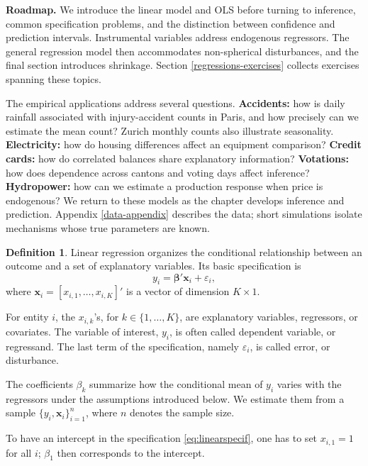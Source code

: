 \documentclass[
  11pt,
]{book}
\theoremstyle{definition}
\newtheorem{definition}{Definition}[chapter]
\theoremstyle{definition}
\theoremstyle{definition}
\theoremstyle{definition}
\theoremstyle{remark}
\begin{document}
\textbf{Roadmap.} We introduce the linear model and OLS before turning to inference, common specification problems, and the distinction between confidence and prediction intervals. Instrumental variables address endogenous regressors. The general regression model then accommodates non-spherical disturbances, and the final section introduces shrinkage. Section \ref{regressions-exercises} collects exercises spanning these topics.

The empirical applications address several questions. \textbf{Accidents:} how is daily rainfall associated with injury-accident counts in Paris, and how precisely can we estimate the mean count? Zurich monthly counts also illustrate seasonality. \textbf{Electricity:} how do housing differences affect an equipment comparison? \textbf{Credit cards:} how do correlated balances share explanatory information? \textbf{Votations:} how does dependence across cantons and voting days affect inference? \textbf{Hydropower:} how can we estimate a production response when price is endogenous? We return to these models as the chapter develops inference and prediction. Appendix \ref{data-appendix} describes the data; short simulations isolate mechanisms whose true parameters are known.

\begin{definition}
\protect\hypertarget{def:essai}{}\label{def:essai}Linear regression organizes the conditional relationship between an outcome and a set of explanatory variables. Its basic specification is
\begin{equation}
y_i = \boldsymbol\beta'\mathbf{x}_{i} + \varepsilon_i,\label{eq:linearspecif}
\end{equation}
where \(\mathbf{x}_{i}=[x_{i,1},\dots,x_{i,K}]'\) is a vector of dimension \(K \times 1\).
\end{definition}

For entity \(i\), the \(x_{i,k}\)'s, for \(k \in \{1,\dots,K\}\), are explanatory variables, regressors, or covariates. The variable of interest, \(y_i\), is often called dependent variable, or regressand. The last term of the specification, namely \(\varepsilon_i\), is called error, or disturbance.

The coefficients \(\beta_k\) summarize how the conditional mean of \(y_i\) varies with the regressors under the assumptions introduced below. We estimate them from a sample \(\{y_i,\mathbf{x}_{i}\}_{i=1}^n\), where \(n\) denotes the sample size.

To have an intercept in the specification \eqref{eq:linearspecif}, one has to set \(x_{i,1}=1\) for all \(i\); \(\beta_1\) then corresponds to the intercept.
\end{document}

